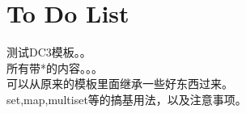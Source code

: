 \section{To Do List}
    测试DC3模板。。\\
    所有带*的内容。。。\\
    可以从原来的模板里面继承一些好东西过来。 \\
    set,map,multiset等的搞基用法，以及注意事项。